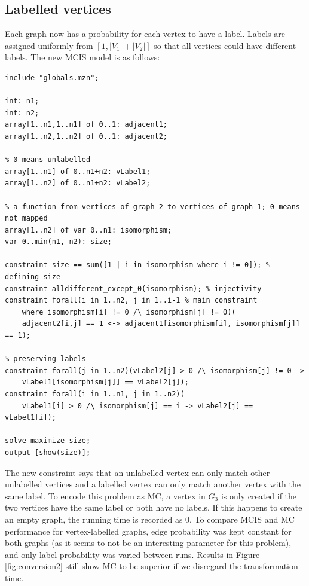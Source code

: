 \documentclass{article}
\theoremstyle{definition}
\begin{document}
\subsection{Labelled vertices}
Each graph now has a probability for each vertex to have a label. Labels are assigned uniformly from $[1, |V_1| + |V_2|]$ so that all vertices could have different labels. The new MCIS model is as follows:
\begin{lstlisting}
include "globals.mzn";

int: n1;
int: n2;
array[1..n1,1..n1] of 0..1: adjacent1;
array[1..n2,1..n2] of 0..1: adjacent2;

% 0 means unlabelled
array[1..n1] of 0..n1+n2: vLabel1;
array[1..n2] of 0..n1+n2: vLabel2;

% a function from vertices of graph 2 to vertices of graph 1; 0 means not mapped
array[1..n2] of var 0..n1: isomorphism;
var 0..min(n1, n2): size;

constraint size == sum([1 | i in isomorphism where i != 0]); % defining size
constraint alldifferent_except_0(isomorphism); % injectivity
constraint forall(i in 1..n2, j in 1..i-1 % main constraint
    where isomorphism[i] != 0 /\ isomorphism[j] != 0)(
    adjacent2[i,j] == 1 <-> adjacent1[isomorphism[i], isomorphism[j]] == 1);
    
% preserving labels
constraint forall(j in 1..n2)(vLabel2[j] > 0 /\ isomorphism[j] != 0 ->
    vLabel1[isomorphism[j]] == vLabel2[j]);
constraint forall(i in 1..n1, j in 1..n2)(
    vLabel1[i] > 0 /\ isomorphism[j] == i -> vLabel2[j] == vLabel1[i]);

solve maximize size;
output [show(size)];
\end{lstlisting}
The new constraint says that an unlabelled vertex can only match other unlabelled vertices and a labelled vertex can only match another vertex with the same label. To encode this problem as MC, a vertex in $G_3$ is only created if the two vertices have the same label or both have no labels. If this happens to create an empty graph, the running time is recorded as 0. To compare MCIS and MC performance for vertex-labelled graphs, edge probability was kept constant for both graphs (as it seems to not be an interesting parameter for this problem), and only label probability was varied between runs. Results in Figure \ref{fig:conversion2} still show MC to be superior if we disregard the transformation time.
\end{document}

